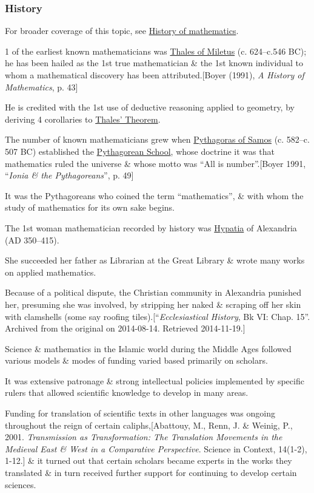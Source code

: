 \documentclass{article}
\begin{document}
\subsubsection{History}
For broader coverage of this topic, see \href{https://en.wikipedia.org/wiki/History_of_mathematics}{History of mathematics}.

%
1 of the earliest known mathematicians was \href{https://en.wikipedia.org/wiki/Thales_of_Miletus}{Thales of Miletus} (c. 624--c.546 BC); he has been hailed as the 1st true mathematician \& the 1st known individual to whom a mathematical discovery has been attributed.[Boyer (1991), \textit{A History of Mathematics}, p. 43]

He is credited with the 1st use of deductive reasoning applied to geometry, by deriving 4 corollaries to \href{https://en.wikipedia.org/wiki/Thales%27_Theorem}{Thales' Theorem}.

%
The number of known mathematicians grew when \href{https://en.wikipedia.org/wiki/Pythagoras_of_Samos}{Pythagoras of Samos} (c. 582--c. 507 BC) established the \href{https://en.wikipedia.org/wiki/Pythagoreans}{Pythagorean School}, whose doctrine it was that mathematics ruled the universe \& whose motto was ``All is number''.[Boyer 1991, ``\textit{Ionia \& the Pythagoreans}'', p. 49]

It was the Pythagoreans who coined the term ``mathematics'', \& with whom the study of mathematics for its own sake begins.

%
The 1st woman mathematician recorded by history was \href{https://en.wikipedia.org/wiki/Hypatia}{Hypatia} of Alexandria (AD 350--415).

She succeeded her father as Librarian at the Great Library \& wrote many works on applied mathematics.

Because of a political dispute, the Christian community in Alexandria punished her, presuming she was involved, by stripping her naked \& scraping off her skin with clamshells (some say roofing tiles).[``\textit{Ecclesiastical History}, Bk VI: Chap. 15''. Archived from the original on 2014-08-14. Retrieved 2014-11-19.]

%
Science \& mathematics in the Islamic world during the Middle Ages followed various models \& modes of funding varied based primarily on scholars.

It was extensive patronage \& strong intellectual policies implemented by specific rulers that allowed scientific knowledge to develop in many areas.

Funding for translation of scientific texts in other languages was ongoing throughout the reign of certain caliphs,[Abattouy, M., Renn, J. \& Weinig, P., 2001. \textit{Transmission as Transformation: The Translation Movements in the Medieval East \& West in a Comparative Perspective}. Science in Context, 14(1-2), 1-12.] \& it turned out that certain scholars became experts in the works they translated \& in turn received further support for continuing to develop certain sciences.
\end{document}

